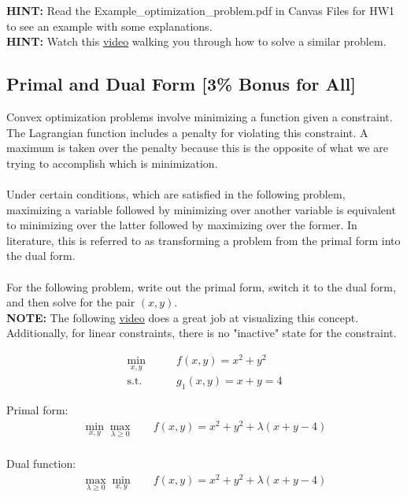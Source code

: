 \documentclass{article}
\begin{document}
\noindent\textbf{HINT:} Read the Example\_optimization\_problem.pdf in Canvas Files for HW1 to see an example with some explanations. \\
\noindent\textbf{HINT:} Watch this \href{https://youtu.be/pR3vGVjzrFs}{video} walking you through how to solve a similar problem.\\

\newpage

\subsection{Primal and Dual Form [3\% Bonus for All]}

Convex optimization problems involve minimizing a function given a constraint. The Lagrangian function includes a penalty for violating this constraint. A maximum is taken over the penalty because this is the opposite of what we are trying to accomplish which is minimization. \\\\ 
Under certain conditions, which are satisfied in the following problem, maximizing a variable followed by minimizing over another variable is equivalent to minimizing over the latter followed by maximizing over the former. In literature, this is referred to as transforming a problem from the primal form into the dual form.\\\\
For the following problem, write out the primal form, switch it to the dual form, and then solve for the pair $(x, y)$.\\
\textbf{NOTE:} The following \href{https://youtu.be/uh1Dk68cfWs?si=MHr26ua-Osu-N23m}{video} does a great job at visualizing this concept. Additionally, for linear constraints, there is no "inactive" state for the constraint.

\begin{align*}
    \min_{x,y} \qquad & f(x,y) = x^{2} + y^{2} \\
    \text{s.t.} \qquad & g_{1}(x,y) = x+y = 4
\end{align*}

Primal form:
\begin{align*}
    \min_{x,y} \max_{\lambda \geq 0}\quad & f(x,y) = x^{2} + y^{2} +\lambda(x+y - 4)\\
\end{align*}

Dual function:
\begin{align*}
    \max_{\lambda \geq 0} \min_{x,y} \quad & f(x,y) = x^{2} + y^{2} +\lambda(x+y - 4)\\
\end{align*}
\end{document}

